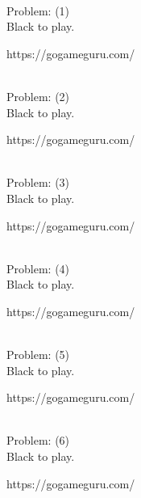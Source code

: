 \documentclass[11pt]{article}
\begin{document}
\begin{minipage}[t]{0.5\textwidth}
  {\centering
  
\\
  Problem: (1)\\
  Black to play.

https://gogameguru.com/\\
  }
\end{minipage}
\begin{minipage}[t]{0.5\textwidth}
  {\centering
  
\\
  Problem: (2)\\
  Black to play.

https://gogameguru.com/\\
  }
\end{minipage}
\begin{minipage}[t]{0.5\textwidth}
  {\centering
  
\\
  Problem: (3)\\
  Black to play.

https://gogameguru.com/\\
  }
\end{minipage}
\begin{minipage}[t]{0.5\textwidth}
  {\centering
  
\\
  Problem: (4)\\
  Black to play.

https://gogameguru.com/\\
  }
\end{minipage}
\begin{minipage}[t]{0.5\textwidth}
  {\centering
  
\\
  Problem: (5)\\
  Black to play.

https://gogameguru.com/\\
  }
\end{minipage}
\begin{minipage}[t]{0.5\textwidth}
  {\centering
  
\\
  Problem: (6)\\
  Black to play.

https://gogameguru.com/\\
  }
\end{minipage}
\end{document}
